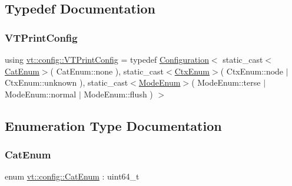 \subsection{Typedef Documentation}
\mbox{\label{namespacevt_1_1config_a2fcb16923fa0d26d60741f06f2933983}} 
\subsubsection{\texorpdfstring{V\+T\+Print\+Config}{VTPrintConfig}}
{\footnotesize\ttfamily using \hyperlink{namespacevt_1_1config_a2fcb16923fa0d26d60741f06f2933983}{vt\+::config\+::\+V\+T\+Print\+Config} = typedef \hyperlink{structvt_1_1config_1_1_configuration}{Configuration}$<$ static\+\_\+cast$<$\hyperlink{namespacevt_1_1config_a6bd1d6215bda0d8ca02811798399f689}{Cat\+Enum}$>$( Cat\+Enum\+::none ), static\+\_\+cast$<$\hyperlink{namespacevt_1_1config_a46e57c33bee1b9f1fa95455af86d80e0}{Ctx\+Enum}$>$( Ctx\+Enum\+::node $\vert$ Ctx\+Enum\+::unknown ), static\+\_\+cast$<$\hyperlink{namespacevt_1_1config_a724e99568632cc0fe9c456c2230270d0}{Mode\+Enum}$>$( Mode\+Enum\+::terse $\vert$ Mode\+Enum\+::normal $\vert$ Mode\+Enum\+::flush ) $>$}



\subsection{Enumeration Type Documentation}
\mbox{\label{namespacevt_1_1config_a6bd1d6215bda0d8ca02811798399f689}} 
\subsubsection{\texorpdfstring{Cat\+Enum}{CatEnum}}
{\footnotesize\ttfamily enum \hyperlink{namespacevt_1_1config_a6bd1d6215bda0d8ca02811798399f689}{vt\+::config\+::\+Cat\+Enum} \+: uint64\+\_\+t}


